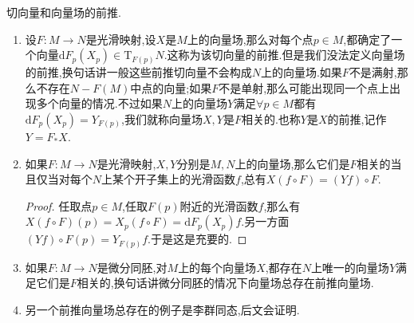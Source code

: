 切向量和向量场的前推.
\begin{enumerate}
	\item 设$F:M\to N$是光滑映射,设$X$是$M$上的向量场,那么对每个点$p\in M$,都确定了一个向量$\mathrm{d}F_p(X_p)\in\mathrm{T}_{F(p)}N$.这称为该切向量的前推.但是我们没法定义向量场的前推,换句话讲一般这些前推切向量不会构成$N$上的向量场.如果$F$不是满射,那么不存在$N-F(M)$中点的向量;如果$F$不是单射,那么可能出现同一个点上出现多个向量的情况.不过如果$N$上的向量场$Y$满足$\forall p\in M$都有$\mathrm{d}F_p(X_p)=Y_{F(p)}$,我们就称向量场$X,Y$是$F$相关的.也称$Y$是$X$的前推,记作$Y=F_*X$.
	\item 如果$F:M\to N$是光滑映射,$X,Y$分别是$M,N$上的向量场,那么它们是$F$相关的当且仅当对每个$N$上某个开子集上的光滑函数$f$,总有$X(f\circ F)=(Yf)\circ F$.
	\begin{proof}
		
		任取点$p\in M$,任取$F(p)$附近的光滑函数$f$,那么有$X(f\circ F)(p)=X_p(f\circ F)=\mathrm{d}F_p(X_p)f$.另一方面$(Yf)\circ F(p)=Y_{F(p)}f$.于是这是充要的.
	\end{proof}
    \item 如果$F:M\to N$是微分同胚,对$M$上的每个向量场$X$,都存在$N$上唯一的向量场$Y$满足它们是$F$相关的,换句话讲微分同胚的情况下向量场总存在前推向量场.
    \item 另一个前推向量场总存在的例子是李群同态,后文会证明.
\end{enumerate}

